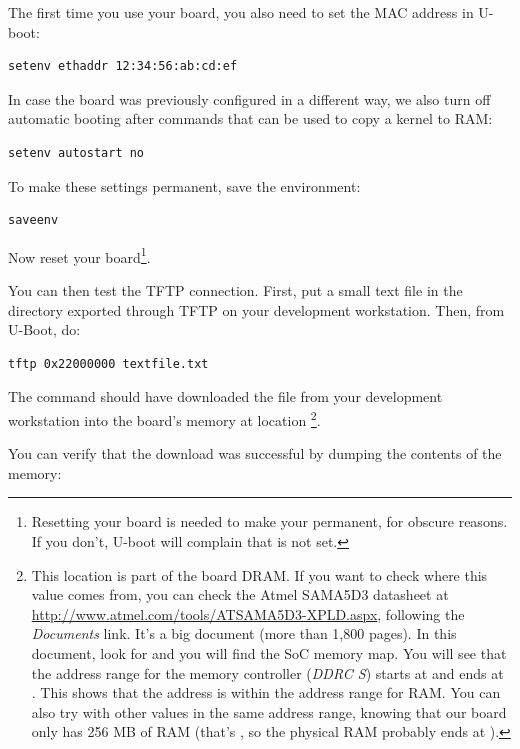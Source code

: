 The first time you use your board, you also need to set the MAC
address in U-boot:

\begin{verbatim}
setenv ethaddr 12:34:56:ab:cd:ef
\end{verbatim}

In case the board was previously configured in a different way, we
also turn off automatic booting after commands that can be used to
copy a kernel to RAM:

\begin{verbatim}
setenv autostart no
\end{verbatim}

To make these settings permanent, save the environment:

\begin{verbatim}
saveenv
\end{verbatim}

Now reset your board\footnote{Resetting your board is needed to
make your  permanent, for obscure reasons. If you
don't, U-boot will complain that  is not
set.}.

You can then test the TFTP connection. First, put a small text file in
the directory exported through TFTP on your development
workstation. Then, from U-Boot, do:

\begin{verbatim}
tftp 0x22000000 textfile.txt
\end{verbatim}

The  command should have downloaded the
 file from your development workstation into
the board's memory at location \footnote{
This location is part of the board DRAM. If you want
to check where this value comes from, you can check the Atmel SAMA5D3
datasheet at \url{http://www.atmel.com/tools/ATSAMA5D3-XPLD.aspx}, 
following the {\em Documents} link. It's a big document (more than 1,800
pages). In this document, look for  and you
will find the SoC memory map. You will see that the address range for
the memory controller ({\em DDRC S}) starts at 
and ends at . This shows that the  
address is within the address range for RAM. You can also try with other
values in the same address range, knowing that our board only has 256 MB
of RAM (that's , so the physical RAM probably ends at
).}.

You can verify that the download was successful by dumping the
contents of the memory:

